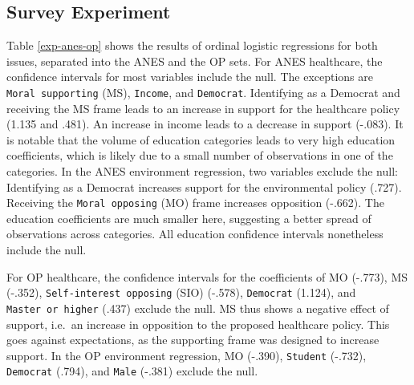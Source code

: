 \documentclass[12pt,econ]{sources/authesis}
\begin{document}
\hypertarget{framing-results-experiment}{%
\subsection{Survey Experiment}\label{framing-results-experiment}}

Table \ref{exp-anes-op} shows the results of ordinal logistic regressions for both issues, separated into the ANES and the OP sets. For ANES healthcare, the confidence intervals for most variables include the null. The exceptions are \texttt{Moral\ supporting} (MS), \texttt{Income}, and \texttt{Democrat}. Identifying as a Democrat and receiving the MS frame leads to an increase in support for the healthcare policy (1.135 and .481). An increase in income leads to a decrease in support (-.083). It is notable that the volume of education categories leads to very high education coefficients, which is likely due to a small number of observations in one of the categories. In the ANES environment regression, two variables exclude the null: Identifying as a Democrat increases support for the environmental policy (.727). Receiving the \texttt{Moral\ opposing} (MO) frame increases opposition (-.662). The education coefficients are much smaller here, suggesting a better spread of observations across categories. All education confidence intervals nonetheless include the null.

For OP healthcare, the confidence intervals for the coefficients of MO (-.773), MS (-.352), \texttt{Self-interest\ opposing} (SIO) (-.578), \texttt{Democrat} (1.124), and \texttt{Master\ or\ higher} (.437) exclude the null. MS thus shows a negative effect of support, i.e.~an increase in opposition to the proposed healthcare policy. This goes against expectations, as the supporting frame was designed to increase support. In the OP environment regression, MO (-.390), \texttt{Student} (-.732), \texttt{Democrat} (.794), and \texttt{Male} (-.381) exclude the null.

\ssp

\footnotesize
\end{document}
